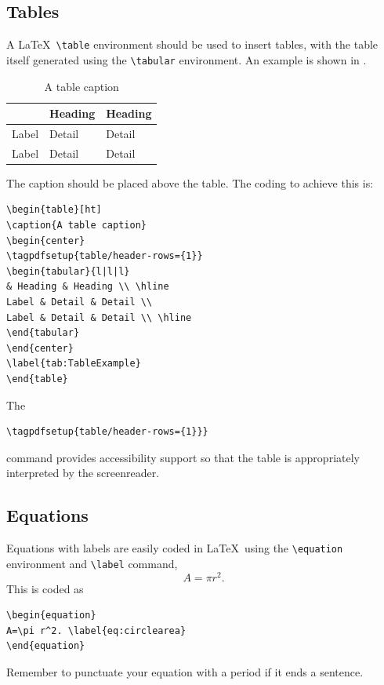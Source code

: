 \documentclass[12pt,oneside]{book} %
\begin{document}
\subsection{Tables}
A \LaTeX\ \verb#\table# environment should be used to insert tables, with the table itself generated using the \verb#\tabular# environment.  An example is shown in .
\begin{table}[ht]
\caption{A table caption}
\begin{center}
\begin{tabular}{l|l|l}
& Heading & Heading \\ \hline
Label & Detail & Detail \\
Label & Detail & Detail \\ \hline
\end{tabular}
\end{center}
\label{tab:TableExample}
\end{table}
The caption should be placed above the table. The coding to achieve this is:
\begin{verbatim}
\begin{table}[ht]
\caption{A table caption}
\begin{center}
\tagpdfsetup{table/header-rows={1}}
\begin{tabular}{l|l|l}
& Heading & Heading \\ \hline
Label & Detail & Detail \\
Label & Detail & Detail \\ \hline
\end{tabular}
\end{center}
\label{tab:TableExample}
\end{table}
\end{verbatim}
The 
\begin{verbatim}
\tagpdfsetup{table/header-rows={1}}} 
\end{verbatim}
command provides accessibility support so that the table is appropriately interpreted by the screenreader.

\subsection{Equations}
Equations with labels are easily coded in \LaTeX\ using the \verb#\equation#  environment and  \verb#\label# command,
\begin{equation}
A=\pi r^2. \label{eq:circlearea}
\end{equation}
This is coded as
\begin{verbatim}
\begin{equation}
A=\pi r^2. \label{eq:circlearea}
\end{equation}
\end{verbatim}
Remember to punctuate your equation with a period if it ends a sentence. 
\end{document}
